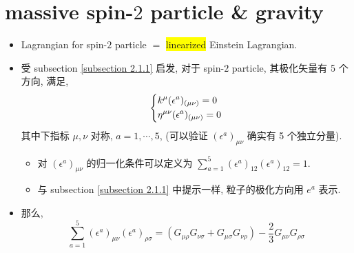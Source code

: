 \section{massive spin-\texorpdfstring{$2$}{2} particle \& gravity}
\begin{itemize}
	\item Lagrangian for spin-$2$ particle $=$ \colorbox{yellow}{linearized} Einstein Lagrangian.
	
	\item 受 subsection \ref{subsection 2.1.1} 启发, 对于 spin-$2$ particle, 其极化矢量有 5 个方向, 满足,
	\begin{equation} \label{2.2.1}
		\begin{dcases}
			k^\mu (\epsilon^a)_{(\mu \nu)} = 0 \\
			\eta^{\mu \nu} (\epsilon^a)_{(\mu \nu)} = 0
		\end{dcases}
	\end{equation}
	其中下指标 $\mu, \nu$ 对称, $a = 1, \cdots, 5$, (可以验证 $(\epsilon^a)_{\mu \nu}$ 确实有 5 个独立分量).
	\begin{itemize}
		\item 对 $(\epsilon^{a})_{\mu \nu}$ 的归一化条件可以定义为 $\sum_{a = 1}^5 (\epsilon^a)_{1 2} (\epsilon^a)_{1 2} = 1$.
		
		\item 与 subsection \ref{subsection 2.1.1} 中提示一样, 粒子的极化方向用 $e^a$ 表示.
	\end{itemize}
	
	\item 那么,
	\begin{equation}
		\sum_{a = 1}^5 (\epsilon^a)_{\mu \nu} (\epsilon^a)_{\rho \sigma} = (G_{\mu \rho} G_{\nu \sigma} + G_{\mu \sigma} G_{\nu \rho}) - \frac{2}{3} G_{\mu \nu} G_{\rho \sigma}
	\end{equation}
	

\end{itemize}
